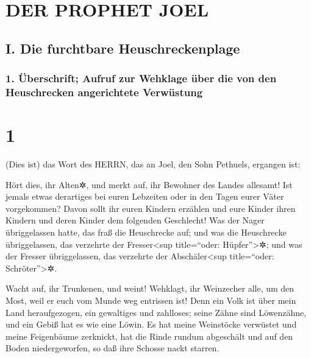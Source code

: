 \hypertarget{der-prophet-joel}{%
\section{DER PROPHET JOEL}\label{der-prophet-joel}}

\hypertarget{i.-die-furchtbare-heuschreckenplage}{%
\subsection{I. Die furchtbare
Heuschreckenplage}\label{i.-die-furchtbare-heuschreckenplage}}

\hypertarget{uxfcberschrift-aufruf-zur-wehklage-uxfcber-die-von-den-heuschrecken-angerichtete-verwuxfcstung}{%
\subsubsection{1. Überschrift; Aufruf zur Wehklage über die von den
Heuschrecken angerichtete
Verwüstung}\label{uxfcberschrift-aufruf-zur-wehklage-uxfcber-die-von-den-heuschrecken-angerichtete-verwuxfcstung}}

\hypertarget{section}{%
\section{1}\label{section}}

(Dies ist) das Wort des HERRN, das an Joel, den Sohn
Pethuels, ergangen ist:

Hört dies, ihr Alten✲, und merkt auf, ihr Bewohner des
Landes allesamt! Ist jemals etwas derartiges bei euren Lebzeiten oder in
den Tagen eurer Väter vorgekommen? Davon sollt ihr euren
Kindern erzählen und eure Kinder ihren Kindern und deren Kinder dem
folgenden Geschlecht! Was der Nager übriggelassen hatte,
das fraß die Heuschrecke auf; und was die Heuschrecke übriggelassen, das
verzehrte der Fresser\textless sup title=``oder: Hüpfer''\textgreater✲;
und was der Fresser übriggelassen, das verzehrte der
Abschäler\textless sup title=``oder: Schröter''\textgreater✲.

Wacht auf, ihr Trunkenen, und weint! Wehklagt, ihr
Weinzecher alle, um den Most, weil er euch vom Munde weg entrissen ist!
Denn ein Volk ist über mein Land heraufgezogen, ein
gewaltiges und zahlloses; seine Zähne sind Löwenzähne, und ein Gebiß hat
es wie eine Löwin. Es hat meine Weinstöcke verwüstet und
meine Feigenbäume zerknickt, hat die Rinde rundum abgeschält und auf den
Boden niedergeworfen, so daß ihre Schosse nackt starren.

